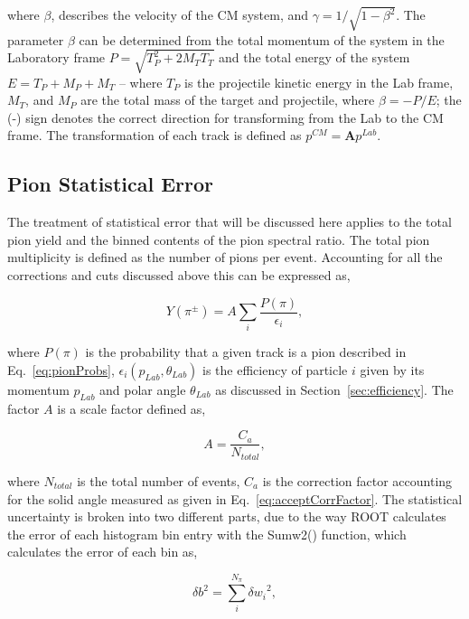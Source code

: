 where $\beta$, describes the velocity of the CM system, and $\gamma=1/ \sqrt{1-\beta^2}$. The parameter $\beta$ can be determined from the total momentum of the system in the Laboratory frame $P = \sqrt{ T_{P}^2 + 2M_{T}T_{T}}$ and the total energy of the system $E = T_{P} + M_{P} + M_{T}$ -- where $T_{P}$ is the projectile kinetic energy in the Lab frame, $M_{T}$, and $M_{P}$ are the total mass of the target and projectile, where $\beta = -P/E$; the (-) sign denotes the correct direction for transforming from the Lab to the CM frame. The transformation of each  track is defined as $p^{CM} = \textbf{A}p^{Lab}$.

\subsection{Pion Statistical Error}

The treatment of statistical error that will be discussed here applies to the total pion yield and the binned contents of the pion spectral ratio. The total pion multiplicity is defined as the number of pions per event. Accounting for all the corrections and cuts discussed above this can be expressed as, 

\begin{equation}
Y(\pi^\pm) = A\sum_{i} \frac{P(\pi)}{\epsilon_i},
\end{equation}

where $P(\pi)$ is the probability that a given track is a pion described in Eq.~\ref{eq:pionProbs}, $\epsilon_i(p_{Lab}, \theta_{Lab})$ is the efficiency of particle $i$ given by its momentum $p_{Lab}$ and polar angle $\theta_{Lab}$ as discussed in Section~\ref{sec:efficiency}. The factor $A$ is a scale factor defined as,

\begin{equation}
 A = \frac{C_a}{N_{total}},
\end{equation}

where $N_{total}$ is the total number of events, $C_a$ is the correction factor accounting for the solid angle measured as given in Eq.~\ref{eq:acceptCorrFactor}. The statistical uncertainty is broken into two different parts, due to the way ROOT calculates the error of each histogram bin entry with the Sumw2() function, which calculates the error of each bin as,

\begin{equation}
{\delta b}^2 = \sum_i^{N_{\pi}} {\delta w_i}^2,
\end{equation}

